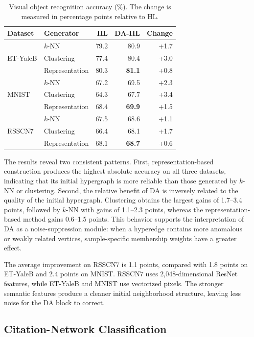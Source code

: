 \begin{table}[t]
\centering
\caption{Visual object recognition accuracy (\%). The change is measured in
percentage points relative to HL.}
\label{tab:visual-main-results}
\scriptsize
\begin{tabular}{llrrr}
\toprule
Dataset & Generator & HL & DA-HL & Change \\
\midrule
\multirow{3}{*}{ET-YaleB}
 & $k$-NN & 79.2 & 80.9 & +1.7 \\
 & Clustering & 77.4 & 80.4 & +3.0 \\
 & Representation & 80.3 & \textbf{81.1} & +0.8 \\
\midrule
\multirow{3}{*}{MNIST}
 & $k$-NN & 67.2 & 69.5 & +2.3 \\
 & Clustering & 64.3 & 67.7 & +3.4 \\
 & Representation & 68.4 & \textbf{69.9} & +1.5 \\
\midrule
\multirow{3}{*}{RSSCN7}
 & $k$-NN & 67.5 & 68.6 & +1.1 \\
 & Clustering & 66.4 & 68.1 & +1.7 \\
 & Representation & 68.1 & \textbf{68.7} & +0.6 \\
\bottomrule
\end{tabular}
\end{table}

The results reveal two consistent patterns. First, representation-based
construction produces the highest absolute accuracy on all three datasets,
indicating that its initial hypergraph is more reliable than those generated by
$k$-NN or clustering. Second, the relative benefit of DA is inversely related
to the quality of the initial hypergraph. Clustering obtains the largest gains
of 1.7--3.4 points, followed by $k$-NN with gains of 1.1--2.3 points, whereas
the representation-based method gains 0.6--1.5 points. This behavior supports
the interpretation of DA as a noise-suppression module: when a hyperedge
contains more anomalous or weakly related vertices, sample-specific membership
weights have a greater effect.

The average improvement on RSSCN7 is 1.1 points, compared with 1.8 points on
ET-YaleB and 2.4 points on MNIST. RSSCN7 uses 2,048-dimensional ResNet features,
while ET-YaleB and MNIST use vectorized pixels. The stronger semantic features
produce a cleaner initial neighborhood structure, leaving less noise for the
DA block to correct.

\subsection{Citation-Network Classification}

